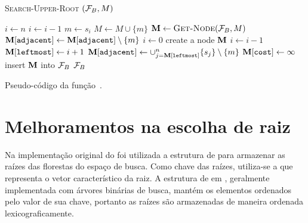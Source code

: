 \begin{algorithm}[H]
\textsc{Search-Upper-Root} $(\mathcal{F}_B, M)$
\begin{algorithmic}[1]
    \State $i \gets n$
        \State $i \gets i - 1$
    \EndWhile
        \State $m \gets s_i$
        \State $M \gets M \cup \{m\}$
        \State $\mathbf M \gets {\normalfont\textsc{Get-Node}} (\mathcal{F}_B, M)$
            \State $\mathbf M[\texttt{adjacent}] \gets \mathbf M[\texttt{adjacent}] \setminus \{m\} $
            \State $i \gets 0$
        \Else
            \State create a node $\mathbf M$
                \State $i \gets i - 1$
            \EndWhile
            \State $\mathbf M[\texttt{leftmost}] \gets i + 1$
            \State $\mathbf M[\texttt{adjacent}] \gets \cup_{j = \mathbf M[\texttt{leftmost}]}^{n} \{s_j\} \setminus \{m\} $
            \State $\mathbf M[\texttt{cost}] \gets \infty$
            \State insert $\mathbf M$ into $\mathcal{F}_B$
        \EndIf
        \Return $\mathcal{F}_B$
    \EndWhile
\end{algorithmic}
\caption{Pseudo-código da função~.}
\label{alg:Search-Upper-Root}
\end{algorithm}

\section{Melhoramentos na escolha de raiz}
Na implementação original do  foi utilizada a estrutura de  para armazenar as raízes das 
florestas do espaço de busca. Como chave das raízes, utiliza-se a 
 que representa o vetor característico da raiz. A 
estrutura de  em , geralmente implementada
com árvores binárias de busca, mantém os elementos ordenados pelo valor
de sua chave, portanto as raízes são armazenadas de maneira ordenada
lexicograficamente.

